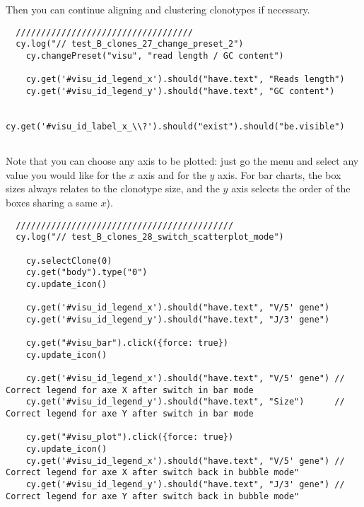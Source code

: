 Then you can continue aligning and clustering clonotypes if necessary.

\begin{verbatim}
  ///////////////////////////////////
  cy.log("// test_B_clones_27_change_preset_2")
    cy.changePreset("visu", "read length / GC content")

    cy.get('#visu_id_legend_x').should("have.text", "Reads length")
    cy.get('#visu_id_legend_y').should("have.text", "GC content")

    cy.get('#visu_id_label_x_\\?').should("exist").should("be.visible")


\end{verbatim}

Note that you can choose any axis to be plotted: just go the  menu and
select any value you would like for the $x$ axis and for the $y$ axis.
For bar charts, the box sizes always relates to the clonotype size,
and the $y$ axis selects the order of the boxes sharing a same $x$).


\begin{verbatim}
  ///////////////////////////////////////////
  cy.log("// test_B_clones_28_switch_scatterplot_mode")

    cy.selectClone(0)
    cy.get("body").type("0")
    cy.update_icon()

    cy.get('#visu_id_legend_x').should("have.text", "V/5' gene")
    cy.get('#visu_id_legend_y').should("have.text", "J/3' gene")

    cy.get("#visu_bar").click({force: true})
    cy.update_icon()

    cy.get('#visu_id_legend_x').should("have.text", "V/5' gene") // Correct legend for axe X after switch in bar mode
    cy.get('#visu_id_legend_y').should("have.text", "Size")      // Correct legend for axe Y after switch in bar mode

    cy.get("#visu_plot").click({force: true})
    cy.update_icon()
    cy.get('#visu_id_legend_x').should("have.text", "V/5' gene") // Correct legend for axe X after switch back in bubble mode"
    cy.get('#visu_id_legend_y').should("have.text", "J/3' gene") // Correct legend for axe Y after switch back in bubble mode"


\end{verbatim}

